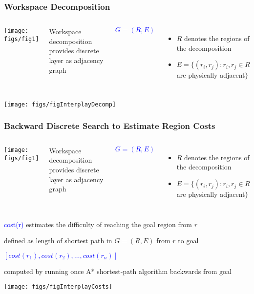 \documentclass[10pt,t]{beamer}
\begin{document}
\begin{frame}
\frametitle{Workspace Decomposition}


\begin{columns}[c]


\texttt{[image: figs/fig1]}

  Workspace decomposition provides discrete layer 
  as adjacency graph 

{\centerline{\textcolor{blue}{$G = (R, E)$}}}

\begin{itemize}
\item $R$ denotes the regions of the decomposition
\item $E = \{(r_i, r_j) : r_i, r_j \in R$ are
  physically adjacent$\}$
\end{itemize}
\end{columns}

\vspace*{25mm}
{\hfill{\texttt{[image: figs/figInterplayDecomp]}}}

\end{frame}

\begin{frame}
\frametitle{Backward Discrete Search to Estimate Region Costs}

 
\begin{columns}[c]

\texttt{[image: figs/fig1]}

  Workspace decomposition provides discrete layer 
  as adjacency graph 

{\centerline{\textcolor{blue}{$G = (R, E)$}}}

\begin{itemize}
\item $R$ denotes the regions of the decomposition
\item $E = \{(r_i, r_j) : r_i, r_j \in R$ are
  physically adjacent$\}$
\end{itemize}
\end{columns}

\vspace*{3mm}

\textcolor{blue}{cost(r)} estimates the difficulty of reaching the goal region from $r$

\hfill{defined as length of shortest path in $G=(R, E)$ from $r$ to goal} 

\vspace*{3mm}
\textcolor{blue}{$[cost(r_1), cost(r_2), \ldots, cost(r_n)]$} 

\hfill{computed by running once A* shortest-path algorithm backwards from goal}


\vspace*{2.7mm}
{\hfill{\texttt{[image: figs/figInterplayCosts]}}}

\end{frame}
\end{document}
